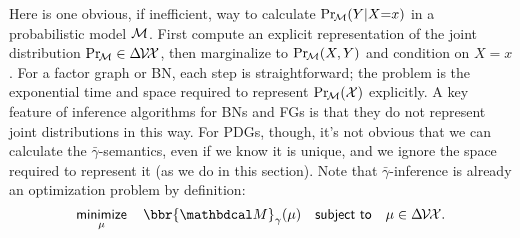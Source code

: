 \documentclass{article}
\newcommand\discard[1]{}
\newcommand\zogamma{{\bar\gamma}}
\begin{document}
Here is one obvious, if inefficient, way to calculate $\Pr_{\!\cal M}(Y|X{=}x)$ in a
probabilistic model $\cal M$. 
First compute an explicit representation of the joint distribution 
$\Pr_{\!\cal M} \in \Delta\mskip-2mu\mathcal V\!\mathcal X$, 
then marginalize to 
$\Pr_{\!\cal M}(X,Y)$ and condition on $X{=}x$.
%
For a factor graph or BN,
each step is
straightforward;
the problem is the exponential time and space required to represent $\Pr_{\!\cal M}(\mathcal X)$ explicitly.
A key feature of inference algorithms for BNs and FGs is that they
do not represent joint distributions in this way.
%
For PDGs, though, it's not
obvious that
we can calculate the $\zogamma$-semantics,
even if
we know it is unique, and
we ignore the space required to represent it (as we do in this section).
Note that $\zogamma$-inference is already an optimization problem by definition:
\[
    \minimize_\mu\quad
        \bbr{\dg M}_\gamma(\mu)
    \quad \subjto\quad \mu \in \Delta\mskip-2mu\V\mskip-2mu\X.
\]
\end{document}
